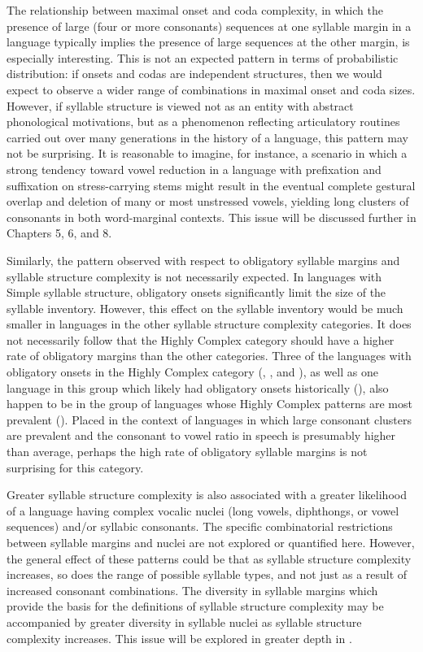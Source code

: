 The relationship between maximal onset and coda complexity, in which the presence of large (four or more consonants) sequences at one syllable margin in a language typically implies the presence of large sequences at the other margin, is especially interesting. This is not an expected pattern in terms of probabilistic distribution: if onsets and codas are independent structures, then we would expect to observe a wider range of combinations in maximal onset and coda sizes. However, if syllable structure is viewed not as an entity with abstract phonological motivations, but as a phenomenon reflecting articulatory routines carried out over many generations in the history of a language, this pattern may not be surprising. It is reasonable to imagine, for instance, a scenario in which a strong tendency toward vowel reduction in a language with prefixation and suffixation on stress-carrying stems might result in the eventual complete gestural overlap and deletion of many or most unstressed vowels, yielding long clusters of consonants in both word-marginal contexts. This issue will be discussed further in Chapters 5, 6, and 8.

Similarly, the pattern observed with respect to obligatory syllable margins and syllable structure complexity is not necessarily expected. In languages with Simple syllable structure, obligatory onsets significantly limit the size of the syllable inventory. However, this effect on the syllable inventory would be much smaller in languages in the other syllable structure complexity categories. It does not necessarily follow that the Highly Complex category should have a higher rate of obligatory margins than the other categories. Three of the languages with obligatory onsets in the Highly Complex category (, , and ), as well as one language in this group which likely had obligatory onsets historically (), also happen to be in the group of languages whose Highly Complex patterns are most prevalent (). Placed in the context of languages in which large consonant clusters are prevalent and the consonant to vowel ratio in speech is presumably higher than average, perhaps the high rate of obligatory syllable margins is not surprising for this category.

Greater syllable structure complexity is also associated with a greater likelihood of a language having complex vocalic nuclei (long vowels, diphthongs, or vowel sequences) and/or syllabic consonants. The specific combinatorial restrictions between syllable margins and nuclei are not explored or quantified here. However, the general effect of these patterns could be that as syllable structure complexity increases, so does the range of possible syllable types, and not just as a result of increased consonant combinations. The diversity in syllable margins which provide the basis for the definitions of syllable structure complexity may be accompanied by greater diversity in syllable nuclei as syllable structure complexity increases. This issue will be explored in greater depth in .

